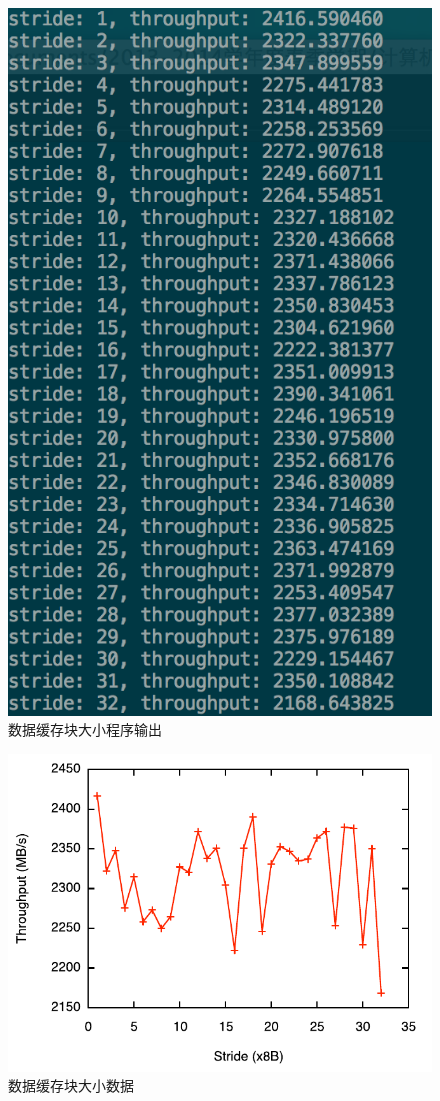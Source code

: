 \documentclass[adobefonts, nocap]{ctexart}
\begin{document}
      \begin{figure}[htbp]
        \includegraphics[width=12cm]{3.png}
        \caption{数据缓存块大小程序输出}
        \label{fig3}
      \end{figure}

      \begin{figure}[htbp]
        \includegraphics[width=12cm]{4.pdf}
        \caption{数据缓存块大小数据}
        \label{fig4}
      \end{figure}
      \clearpage
\end{document}
